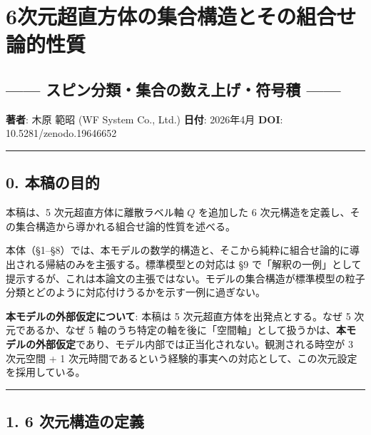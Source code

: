 \documentclass[
  a4paper,11pt]{ltjsarticle}
\theoremstyle{definition}
\theoremstyle{remark}
\begin{document}
\section{6次元超直方体の集合構造とその組合せ論的性質}\label{ux6b21ux5143ux8d85ux76f4ux65b9ux4f53ux306eux96c6ux5408ux69cbux9020ux3068ux305dux306eux7d44ux5408ux305bux8ad6ux7684ux6027ux8cea}

\subsection{------ スピン分類・集合の数え上げ・符号積
------}\label{ux30b9ux30d4ux30f3ux5206ux985eux96c6ux5408ux306eux6570ux3048ux4e0aux3052ux7b26ux53f7ux7a4d}

\textbf{著者}: 木原 範昭 (WF System Co., Ltd.) \textbf{日付}: 2026年4月
\textbf{DOI}: 10.5281/zenodo.19646652

\begin{center}\rule{0.5\linewidth}{0.5pt}\end{center}

\subsection{0. 本稿の目的}\label{ux672cux7a3fux306eux76eeux7684}

本稿は、5 次元超直方体に離散ラベル軸 \(Q\) を追加した 6
次元構造を定義し、その集合構造から導かれる組合せ論的性質を述べる。

本体（§1--§8）では、本モデルの数学的構造と、そこから純粋に組合せ論的に導出される帰結のみを主張する。標準模型との対応は
§9
で「解釈の一例」として提示するが、これは本論文の主張ではない。モデルの集合構造が標準模型の粒子分類とどのように対応付けうるかを示す一例に過ぎない。

\textbf{本モデルの外部仮定について}: 本稿は 5
次元超直方体を出発点とする。なぜ 5 次元であるか、なぜ 5
軸のうち特定の軸を後に「空間軸」として扱うかは、\textbf{本モデルの外部仮定}であり、モデル内部では正当化されない。観測される時空が
3 次元空間 + 1
次元時間であるという経験的事実への対応として、この次元設定を採用している。

\begin{center}\rule{0.5\linewidth}{0.5pt}\end{center}

\subsection{1. 6
次元構造の定義}\label{ux6b21ux5143ux69cbux9020ux306eux5b9aux7fa9}
\end{document}

